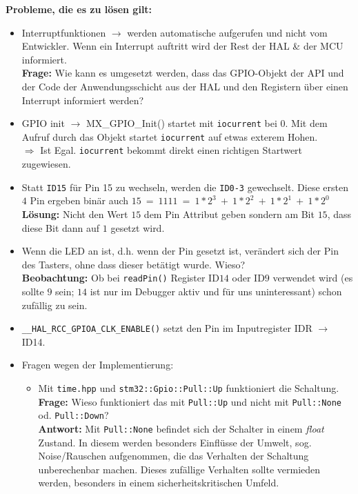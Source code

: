 \textbf{Probleme, die es zu lösen gilt:}
\begin{itemize}
	\item Interruptfunktionen $\rightarrow$ werden automatische aufgerufen und nicht vom Entwickler. Wenn ein Interrupt auftritt wird der Rest der HAL \& der MCU informiert.\\ \textbf{Frage:} Wie kann es umgesetzt werden, dass das GPIO-Objekt der API und der Code der Anwendungsschicht aus der HAL und den Registern über einen Interrupt informiert werden?
	\item GPIO init $\rightarrow$ MX\_GPIO\_Init() startet mit \texttt{iocurrent} bei $0$. Mit dem Aufruf durch das Objekt startet \texttt{iocurrent} auf etwas exterem Hohen. \\ $\Longrightarrow$ Ist Egal. \texttt{iocurrent} bekommt direkt einen richtigen Startwert zugewiesen.
	\item Statt \texttt{ID15} für Pin 15 zu wechseln, werden die \texttt{ID0-3} gewechselt. Diese ersten $4$ Pin ergeben binär auch $15\ =\ 1111\ =\ 1*2^3\ +\ 1*2^2\ +\ 1*2^1\ +\ 1*2^0$ \\ \textbf{Lösung:} Nicht den Wert $15$ dem Pin Attribut geben sondern am Bit $15$, dass diese Bit dann auf $1$ gesetzt wird.
	\item Wenn die LED an ist, d.h. wenn der Pin gesetzt ist, verändert sich der Pin des Tasters, ohne dass dieser betätigt wurde. Wieso?\\ \textbf{Beobachtung:} Ob bei \texttt{readPin()} Register ID$14$ oder ID$9$ verwendet wird (es sollte $9$ sein; $14$ ist nur im Debugger aktiv und für uns uninteressant) schon zufällig zu sein.
	\item \texttt{\_\_HAL\_RCC\_GPIOA\_CLK\_ENABLE()} setzt den Pin im Inputregister IDR $\rightarrow$ ID14. \clearpage
	\item Fragen wegen der Implementierung:
	\begin{itemize}
		\item Mit \texttt{time.hpp} und \texttt{stm32::Gpio::Pull::Up} funktioniert die Schaltung.\\ \textbf{Frage:} Wieso funktioniert das mit \texttt{Pull::Up} und nicht mit \texttt{Pull::None} od. \texttt{Pull::Down}?\\ \textbf{Antwort:} Mit \texttt{Pull::None} befindet sich der Schalter in einem \emph{float} Zustand. In diesem werden besonders Einflüsse der Umwelt, sog. Noise/Rauschen aufgenommen, die das Verhalten der Schaltung unberechenbar machen. Dieses zufällige Verhalten sollte vermieden werden, besonders in einem sicherheitskritischen Umfeld.
	\end{itemize}
	
\end{itemize}

